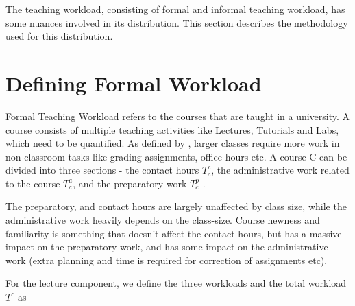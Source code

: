 \label{chapter:formal_informal_workload}

The teaching workload, consisting of formal and informal teaching workload, has some nuances involved in its distribution. This section describes the methodology used for this distribution.

\section{Defining Formal Workload}

\label{section:defining_formal_workload}

Formal Teaching Workload refers to the courses that are taught in a university. A course consists of multiple teaching activities like Lectures, Tutorials and Labs, which need to be quantified. As defined by \parencite{griffith2020framework}, larger classes require more work in non-classroom tasks like grading assignments, office hours etc. A course C can be divided into three sections - the contact hours \(T^c_c\), the administrative work related to the course \(T^a_c\), and the preparatory work \(T^p_c\) .

The preparatory, and contact hours are largely unaffected by class size, while the administrative work heavily depends on the class-size. Course newness and familiarity is something that doesn't affect the contact hours, but has a massive impact on the preparatory work, and has some impact on the administrative work (extra planning and time is required for correction of assignments etc).

For the lecture component, we define the three workloads and the total workload \(T^c\) as

